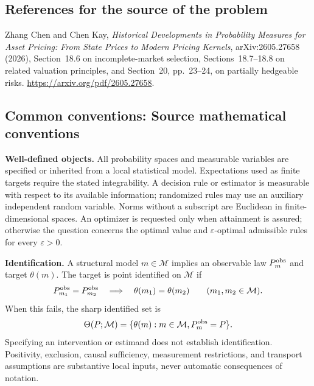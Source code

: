 \documentclass[11pt,a4paper]{article}
\begin{document}
\subsection*{References for the source of the problem}
Zhang Chen and Chen Kay, \emph{Historical Developments in Probability Measures for Asset Pricing: From State Prices to Modern Pricing Kernels}, arXiv:2605.27658 (2026), Section~18.6 on incomplete-market selection, Sections~18.7--18.8 on related valuation principles, and Section~20, pp.~23--24, on partially hedgeable risks. \url{https://arxiv.org/pdf/2605.27658}.

\subsection*{Common conventions: Source mathematical conventions}

\textbf{Well-defined objects.}
All probability spaces and measurable variables are specified or inherited
from a local statistical model. Expectations used as finite targets require
the stated integrability. A decision rule or estimator is measurable with
respect to its available information; randomized rules may use an auxiliary
independent random variable. Norms without a subscript are Euclidean in
finite-dimensional spaces. An optimizer is requested only when attainment
is assured; otherwise the question concerns the optimal value and
$\varepsilon$-optimal admissible rules for every $\varepsilon>0$.

\textbf{Identification.}
A structural model $m\in\mathcal M$ implies an observable law
$P_m^{\rm obs}$ and target $\theta(m)$. The target is point identified on
$\mathcal M$ if
\[
 P_{m_1}^{\rm obs}=P_{m_2}^{\rm obs}
 \quad\Longrightarrow\quad\theta(m_1)=\theta(m_2)
 \qquad(m_1,m_2\in\mathcal M).
\]
When this fails, the sharp identified set is
\[
 \Theta(P;\mathcal M)=\{\theta(m):m\in\mathcal M,
                                  P_m^{\rm obs}=P\}.
\]
Specifying an intervention or estimand does not establish identification.
Positivity, exclusion, causal sufficiency, measurement restrictions, and
transport assumptions are substantive local inputs, never automatic
consequences of notation.
\end{document}
